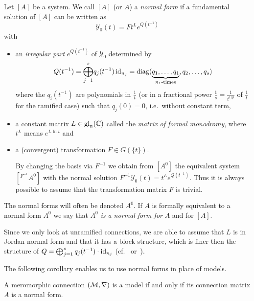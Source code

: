 \begin{defn}\label{defn:normSol}
  Let $[A]$ be a system.
  We call $[A]$ (or $A$) a \emph{normal form} if a fundamental solution of
  $[A]$ can be written as
  \[
    \mathcal{Y}_0(t)=F t^L e^{Q(t^{-1})}
  \]
  with
  \begin{itemize}
    \item an \emph{irregular part} $e^{Q(t^{-1})}$ of $\mathcal{Y}_0$
      determined by
      \[
        Q(t^{-1})=\underset{j=1}{\overset{s}{\bigoplus}}q_j(t^{-1})\id_{n_j}
          =\diag(\underset{n_1\text{-times}}{\underbrace{%
          q_1,\dots,q_1}},q_2,\dots,q_s)
      \]
      where the $q_i(t^{-1})$ are polynomials in $\frac{1}{t}$ (or in a
      fractional power $\frac{1}{s}=\frac{1}{t^{1/p}}$ of $\frac{1}{t}$ for the
      ramified case) such that $q_j(0)=0$, i.e.\ without constant term,
    \item a constant matrix $L\in\operatorname{gl}_n(\mathbb{C})$ called the \emph{matrix of formal
      monodromy}, where $t^L$ means $e^{L\ln t}$ and
    \item a (convergent) transformation $F\in G(\!\{t\}\!)$.
      \begin{s-rem}
        By changing the basis via $F^{-1}$ we obtain from $[A^0]$ the
        equivalent system $[{}^{F^{-1}}\!A^0]$ with the normal solution
        $F^{-1}\mathcal{Y}_0(t)=t^L e^{Q(t^{-1})}$.
        Thus it is always possible to assume that the transformation matrix $F$
        is trivial.
      \end{s-rem}
  \end{itemize}
  The normal forms will often be denoted $A^0$.
  If $A$ is formally equivalent to a normal form $A^0$ we say that $A^0$
  \emph{is a normal form for} $A$ and for $[A]$.
\end{defn}
\begin{cor}\label{cor:structuralAssumptions}
  Since we only look at unramified connections, we are able to assume that $L$
  is in Jordan normal form and that it has a block structure, which is finer
  then the structure of $Q=\bigoplus_{j=1}^sq_j(t^{-1})\cdot\operatorname{id}_{n_j}$
  (cf.~\cite[Sec.1]{Remy2014} or~\cite[Sec.4]{Martinet1991}).
\end{cor}
The following corollary enables us to use normal forms in place of models.
\begin{cor}
  A meromorphic connection $(\mathcal{M},\nabla)$ is a model if and only if its
  connection matrix $A$ is a normal form.
\end{cor}


